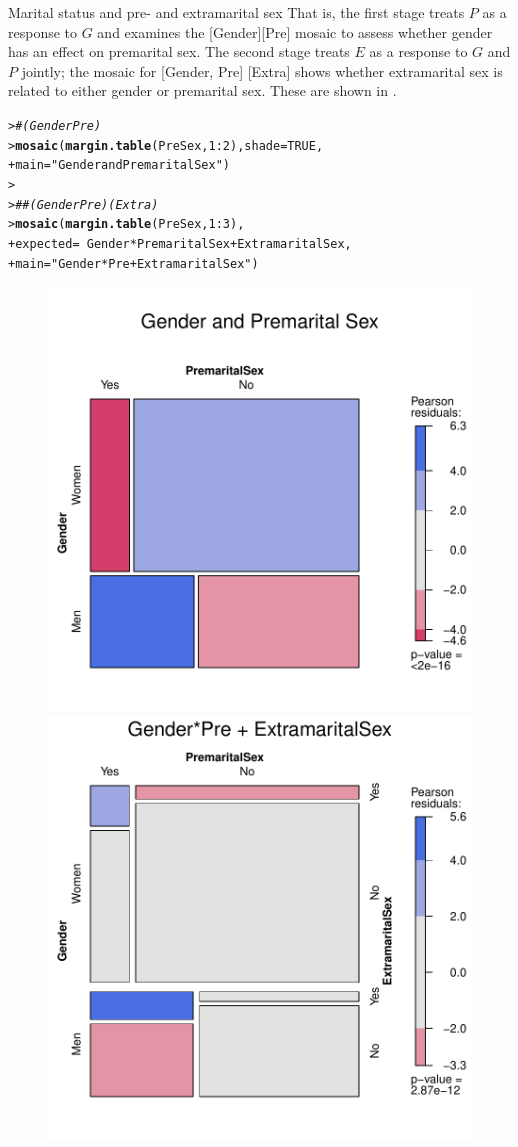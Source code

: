 \documentclass[10pt,krantz2]{krantz}\usepackage[]{graphicx}\usepackage[]{color}
\makeatletter
\newcommand{\hlnum}[1]{\textcolor[rgb]{0.686,0.059,0.569}{#1}}%
\newcommand{\hlstr}[1]{\textcolor[rgb]{0.192,0.494,0.8}{#1}}%
\newcommand{\hlcom}[1]{\textcolor[rgb]{0.678,0.584,0.686}{\textit{#1}}}%
\newcommand{\hlopt}[1]{\textcolor[rgb]{0,0,0}{#1}}%
\newcommand{\hlstd}[1]{\textcolor[rgb]{0.345,0.345,0.345}{#1}}%
\newcommand{\hlkwc}[1]{\textcolor[rgb]{0.333,0.667,0.333}{#1}}%
\newcommand{\hlkwd}[1]{\textcolor[rgb]{0.737,0.353,0.396}{\textbf{#1}}}%
\newenvironment{kframe}{%
 \def\at@end@of@kframe{}%
 \ifinner\ifhmode%
  \def\at@end@of@kframe{\end{minipage}}%
  \begin{minipage}{\columnwidth}%
 \fi\fi%
 \def\FrameCommand##1{\hskip\@totalleftmargin \hskip-\fboxsep
 \colorbox{shadecolor}{##1}\hskip-\fboxsep
     \hskip-\linewidth \hskip-\@totalleftmargin \hskip\columnwidth}%
 \MakeFramed {\advance\hsize-\width
   \@totalleftmargin\z@ \linewidth\hsize
   \@setminipage}}%
 {\par\unskip\endMakeFramed%
 \at@end@of@kframe}
\newenvironment{knitrout}{}{} %
\renewenvironment{knitrout}{\small\renewcommand{\baselinestretch}{.85}}{} %
\makeatother
\begin{document}
\begin{Example}[marital1]{Marital status and pre- and extramarital sex}
That is, the first stage  treats $P$ as a
response to $G$ and examines the [Gender][Pre] mosaic to assess
whether gender has an effect on premarital sex.  The second stage
treats $E$ as a response to $G$ and $P$ jointly;  the
mosaic for [Gender, Pre] [Extra] shows whether extramarital sex
is related to either gender or premarital sex.  These are shown
in .

\begin{knitrout}
\color{fgcolor}\begin{kframe}
\begin{alltt}
\hlstd{> }\hlcom{# (Gender Pre)}
\hlstd{> }\hlkwd{mosaic}\hlstd{(}\hlkwd{margin.table}\hlstd{(PreSex,} \hlnum{1} \hlopt{:} \hlnum{2}\hlstd{),} \hlkwc{shade} \hlstd{=} \hlnum{TRUE}\hlstd{,}
\hlstd{+ }                \hlkwc{main} \hlstd{=} \hlstr{"Gender and Premarital Sex"}\hlstd{)}
\hlstd{> }
\hlstd{> }\hlcom{## (Gender Pre)(Extra)}
\hlstd{> }\hlkwd{mosaic}\hlstd{(}\hlkwd{margin.table}\hlstd{(PreSex,} \hlnum{1} \hlopt{:} \hlnum{3}\hlstd{),}
\hlstd{+ }       \hlkwc{expected} \hlstd{=} \hlopt{~} \hlstd{Gender} \hlopt{*} \hlstd{PremaritalSex} \hlopt{+} \hlstd{ExtramaritalSex ,}
\hlstd{+ }       \hlkwc{main} \hlstd{=} \hlstr{"Gender*Pre + ExtramaritalSex"}\hlstd{)}
\end{alltt}
\end{kframe}\begin{figure}[!htbp]

\centerline{\includegraphics[width=.49\textwidth]{ch05/fig/presex2-1} 
\includegraphics[width=.49\textwidth]{ch05/fig/presex2-2} }


\end{figure}
\end{knitrout}
\end{Example}
\end{document}
